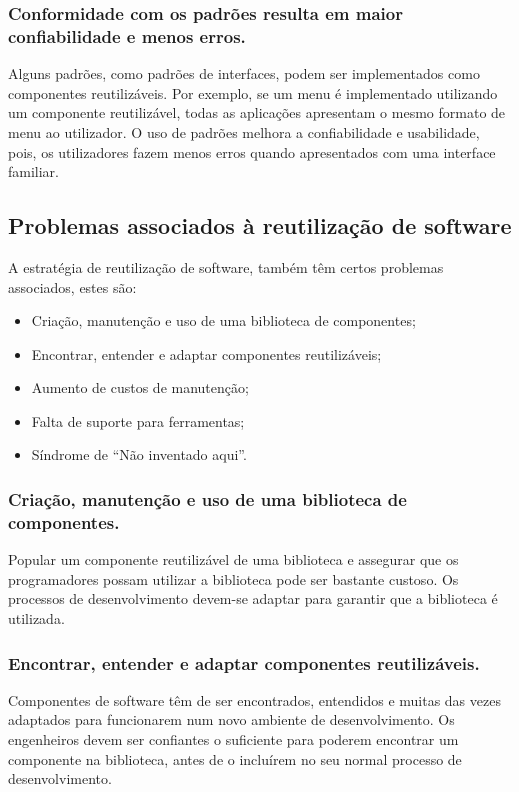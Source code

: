 \documentclass[runningheads]{llncs}
\begin{document}
\subsubsection{Conformidade com os padrões resulta em maior confiabilidade e menos erros.}

Alguns padrões, como padrões de interfaces, podem ser implementados como componentes reutilizáveis. Por exemplo, se um menu é implementado utilizando um componente reutilizável, todas as aplicações apresentam o mesmo formato de menu ao utilizador. O uso de padrões melhora a confiabilidade e usabilidade, pois, os utilizadores fazem menos erros quando apresentados com uma interface familiar.

\subsection{Problemas associados à reutilização de software}

A estratégia de reutilização de software, também têm certos problemas associados, estes são:

\begin{itemize}
    \item Criação, manutenção e uso de uma biblioteca de componentes;
    \item Encontrar, entender e adaptar componentes reutilizáveis;
    \item Aumento de custos de manutenção;
    \item Falta de suporte para ferramentas;
    \item Síndrome de “Não inventado aqui”.
\end{itemize}

\subsubsection{Criação, manutenção e uso de uma biblioteca de componentes.}

Popular um componente reutilizável de uma biblioteca e assegurar que os programadores possam utilizar a biblioteca pode ser bastante custoso. Os processos de desenvolvimento devem-se adaptar para garantir que a biblioteca é utilizada.

\subsubsection{Encontrar, entender e adaptar componentes reutilizáveis.}

Componentes de software têm de ser encontrados, entendidos e muitas das vezes adaptados para funcionarem num novo ambiente de desenvolvimento. Os engenheiros devem ser confiantes o suficiente para poderem encontrar um componente na biblioteca, antes de o incluírem no seu normal processo de desenvolvimento.
\end{document}
